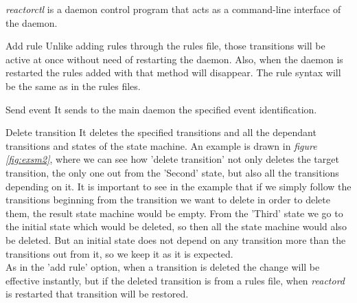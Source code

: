 \emph{reactorctl} is a daemon control program that acts as a command-line interface of the daemon.
\begin{list}{-}{Its options are:}
  \item Add rule
    \subitem Unlike adding rules through the rules file, those transitions will be active at once without need of restarting the 
      daemon. Also, when the daemon is restarted the rules added with that method will disappear. The rule syntax will be the same as in
      the rules files.
  \item Send event
    \subitem It sends to the main daemon the specified event identification.
  \item Delete transition
    \subitem It deletes the specified transitions and all the dependant transitions and states of the state machine. An example is drawn 
      in \emph{figure \ref{fig:exsm2}}, where we can see how 'delete transition' not only deletes the target transition, the only one out 
      from the 'Second' state, but also all the transitions depending on it. It is important to see in the example that if we simply
      follow the transitions beginning from the transition we want to delete in order to delete them, the result state machine would be 
      empty. From the 'Third' state we go to the initial state which would be deleted, so then all the state machine would also be deleted.
      But an initial state does not depend on any transition more than the transitions out from it, so we keep it as it is expected.\\
      As in the 'add rule' option, when a transition is deleted the change will be effective instantly, but 
      if the deleted transition is from a rules file, when \emph{reactord} is restarted that transition will be restored.
\end{list}
